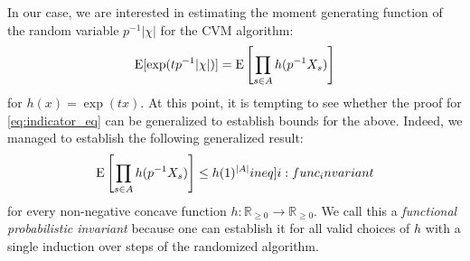 In our case, we are interested in estimating the moment generating function of the random variable $p^{-1} |\chi|$ for the CVM algorithm:
\[
  \operatorname{\mathrm{E}} [\exp( t p^{-1} |\chi| )] = \operatorname{\mathrm{E}} \left[ \prod_{s \in A} h(p^{-1} X_s) \right]
\]
for $h(x) = \exp(tx)$.
At this point, it is tempting to see whether the proof for \cref{eq:indicator_eq} can be generalized to establish bounds for the above.
Indeed, we managed to establish the following generalized result:
\begin{align}
  \expect \left[ \prod_{s \in A} h(p^{-1} X_s) \right] \leq h(1)^{|A|} \label[ineq]{i:func_invariant}
\end{align}
for every non-negative concave function $h : \mathbb R_{\geq 0} \rightarrow \mathbb R_{\geq 0}$.
We call this a \emph{functional probabilistic invariant} because one can establish it for all valid choices of $h$ with a single induction over steps of the randomized algorithm.

